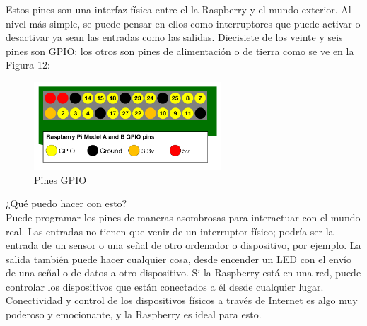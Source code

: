\documentclass[11pt,letterpaper]{article}
\begin{document}
\newpage

Estos pines son una interfaz física entre el la Raspberry y el mundo exterior. Al nivel más simple, se puede pensar en ellos como interruptores que puede activar o desactivar ya sean las entradas como las salidas. Diecisiete de los veinte y seis pines son GPIO; los otros son pines de alimentación o de tierra como se ve en la Figura 12:

\begin{figure}[ht!]
\caption{Pines GPIO}
\centering
\includegraphics[width=7cm]{giop1}
\end{figure}

¿Qué puedo hacer con esto?\\

Puede programar los pines de maneras asombrosas para interactuar con el mundo real. Las entradas no tienen que venir de un interruptor físico; podría ser la entrada de un sensor o una señal de otro ordenador o dispositivo, por ejemplo. La salida también puede hacer cualquier cosa, desde encender un LED con el envío de una señal o de datos a otro dispositivo. Si la Raspberry está en una red, puede controlar los dispositivos que están conectados a él desde cualquier lugar. Conectividad y control de los dispositivos físicos a través de Internet es algo muy poderoso y emocionante, y la Raspberry es ideal para esto.

\newpage



\end{document}

